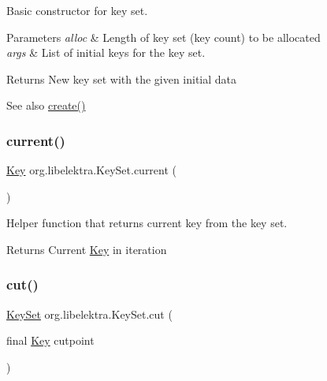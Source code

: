 Basic constructor for key set. 


\begin{DoxyParams}{Parameters}
{\em alloc} & Length of key set (key count) to be allocated \\
\hline
{\em args} & List of initial keys for the key set. \\
\hline
\end{DoxyParams}
\begin{DoxyReturn}{Returns}
New key set with the given initial data 
\end{DoxyReturn}
\begin{DoxySeeAlso}{See also}
\mbox{\hyperlink{classorg_1_1libelektra_1_1KeySet_ac0ba4b88bef5e731b586f4ca63b9ab7f}{create()}} 
\end{DoxySeeAlso}
\mbox{\label{classorg_1_1libelektra_1_1KeySet_a684ac5513b51d841cc04bdcdb203c4cf}} 
\subsubsection{\texorpdfstring{current()}{current()}}
{\footnotesize\ttfamily \mbox{\hyperlink{classorg_1_1libelektra_1_1Key}{Key}} org.\+libelektra.\+Key\+Set.\+current (\begin{DoxyParamCaption}{ }\end{DoxyParamCaption})\hspace{0.3cm}{\ttfamily [inline]}}



Helper function that returns current key from the key set. 

\begin{DoxyReturn}{Returns}
Current \mbox{\hyperlink{classorg_1_1libelektra_1_1Key}{Key}} in iteration 
\end{DoxyReturn}
\mbox{\label{classorg_1_1libelektra_1_1KeySet_a470743c3a6f873427d057c6ce7e3661c}} 
\subsubsection{\texorpdfstring{cut()}{cut()}}
{\footnotesize\ttfamily \mbox{\hyperlink{classorg_1_1libelektra_1_1KeySet}{Key\+Set}} org.\+libelektra.\+Key\+Set.\+cut (\begin{DoxyParamCaption}\item[{final \mbox{\hyperlink{classorg_1_1libelektra_1_1Key}{Key}}}]{cutpoint }\end{DoxyParamCaption})\hspace{0.3cm}{\ttfamily [inline]}}



